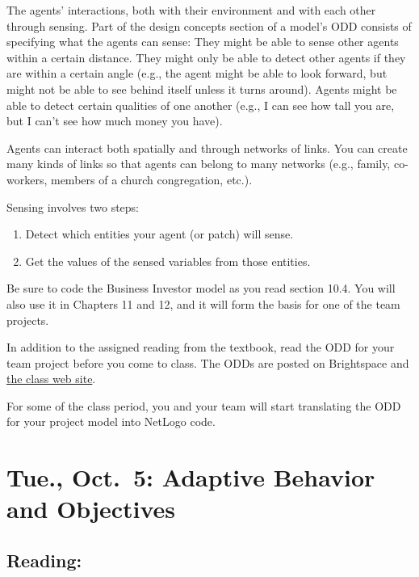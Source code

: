 \documentclass[
]{article}
\providecommand{\tightlist}{%
  \setlength{\itemsep}{0pt}\setlength{\parskip}{0pt}}
\begin{document}
The agents' interactions, both with their environment and with each
other through sensing. Part of the design concepts section of a model's
ODD consists of specifying what the agents can sense: They might be able
to sense other agents within a certain distance. They might only be able
to detect other agents if they are within a certain angle (e.g., the
agent might be able to look forward, but might not be able to see behind
itself unless it turns around). Agents might be able to detect certain
qualities of one another (e.g., I can see how tall you are, but I can't
see how much money you have).

Agents can interact both spatially and through networks of links. You
can create many kinds of links so that agents can belong to many
networks (e.g., family, co-workers, members of a church congregation,
etc.).

Sensing involves two steps:

\begin{enumerate}
\def\labelenumi{\arabic{enumi}.}
\tightlist
\item
  Detect which entities your agent (or patch) will sense.
\item
  Get the values of the sensed variables from those entities.
\end{enumerate}

Be sure to code the Business Investor model as you read section 10.4.
You will also use it in Chapters 11 and 12, and it will form the basis
for one of the team projects.

In addition to the assigned reading from the textbook, read the ODD for
your team project before you come to class. The ODDs are posted on
Brightspace and \href{https://ees4760.jgilligan.org/projects/}{the class
web site}.

For some of the class period, you and your team will start translating
the ODD for your project model into NetLogo code.

\hypertarget{tue.-oct.-5-adaptive-behavior-and-objectives}{%
\section{Tue., Oct.~5: Adaptive Behavior and
Objectives}\label{tue.-oct.-5-adaptive-behavior-and-objectives}}

\hypertarget{reading-11}{%
\subsection{Reading:}\label{reading-11}}
\end{document}
